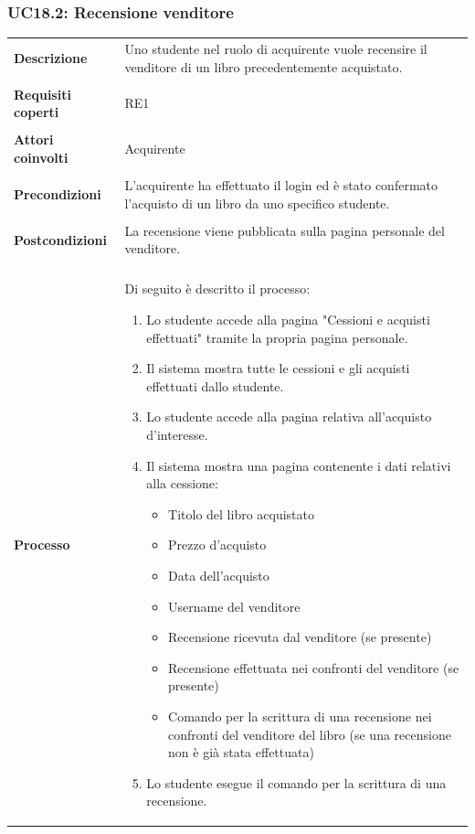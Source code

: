 \documentclass[10pt,a4paper]{article}
\begin{document}
	\subsubsection{UC18.2: Recensione venditore}
	\begin{tabular}{lp{}}
		\textbf{Descrizione}&Uno studente nel ruolo di acquirente vuole recensire il venditore di un libro precedentemente acquistato.\\
		\\
		\textbf{Requisiti coperti}&RE1\\
		\\
		\textbf{Attori coinvolti}&Acquirente\\
		\\
		\textbf{Precondizioni}&L'acquirente ha effettuato il login ed è stato confermato l'acquisto di un libro da uno specifico studente.\\
		\\
		\textbf{Postcondizioni}&La recensione viene pubblicata sulla pagina personale del venditore.\\
		\\
		\textbf{Processo}&Di seguito è descritto il processo:
		\begin{enumerate}
			\item Lo studente accede alla pagina "Cessioni e acquisti effettuati" tramite la propria pagina personale.
			\item Il sistema mostra tutte le cessioni e gli acquisti effettuati dallo studente.
			\item Lo studente accede alla pagina relativa all'acquisto d'interesse.
			\item Il sistema mostra una pagina contenente i dati relativi alla cessione:
			\begin{itemize}
				\item Titolo del libro acquistato
				\item Prezzo d'acquisto
				\item Data dell'acquisto
				\item Username del venditore
				\item Recensione ricevuta dal venditore (se presente)
				\item Recensione effettuata nei confronti del venditore (se presente)
				\item Comando per la scrittura di una recensione nei confronti del venditore del libro (se una recensione non è già stata effettuata)
			\end{itemize}
			\item Lo studente esegue il comando per la scrittura di una recensione.

\end{enumerate}
\end{tabular}
\end{document}
